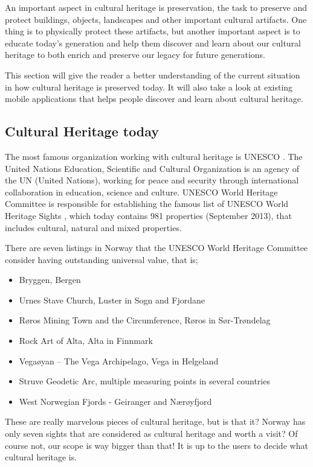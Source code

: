 \documentclass[11pt]{book}
\begin{document}
An important aspect in cultural heritage is preservation, the task to preserve and protect buildings, objects, landscapes and other important cultural artifacts. One thing is to physically protect these artifacts, but another important aspect is to educate today's generation and help them discover and learn about our cultural heritage to both enrich and preserve our legacy for future generations.

This section will give the reader a better understanding of the current situation in how cultural heritage is preserved today. It will also take a look at existing mobile applications that helps people discover and learn about cultural heritage.

\subsection{Cultural Heritage today}
The most famous organization working with cultural heritage is UNESCO \cite{UNESCO:intro}. The United Nations Education, Scientific and Cultural Organization is an agency of the UN (United Nations), working for peace and security through international collaboration in education, science and culture. UNESCO World Heritage Committee is responsible for establishing  the famous list of UNESCO World Heritage Sights \cite{UNESCO:worldheritage}, which today contains 981 properties (September 2013), that includes cultural, natural and mixed properties.

There are seven listings in Norway that the UNESCO World Heritage Committee consider having outstanding universal value, that is;

\begin{itemize}
  \item Bryggen, Bergen
  \item Urnes Stave Church, Luster in Sogn and Fjordane
  \item Røros Mining Town and the Circumference, Røros in Sør-Trøndelag
  \item Rock Art of Alta, Alta in Finnmark
  \item Vegaøyan -- The Vega Archipelago, Vega in Helgeland
  \item Struve Geodetic Arc, multiple measuring points in several countries
  \item West Norwegian Fjords - Geiranger and Nærøyfjord
\end{itemize}

These are really marvelous pieces of cultural heritage, but is that it? Norway has only seven sights that are considered as cultural heritage and worth a visit? Of course not, our scope is way bigger than that! It is up to the users to decide what cultural heritage is.
\end{document}

